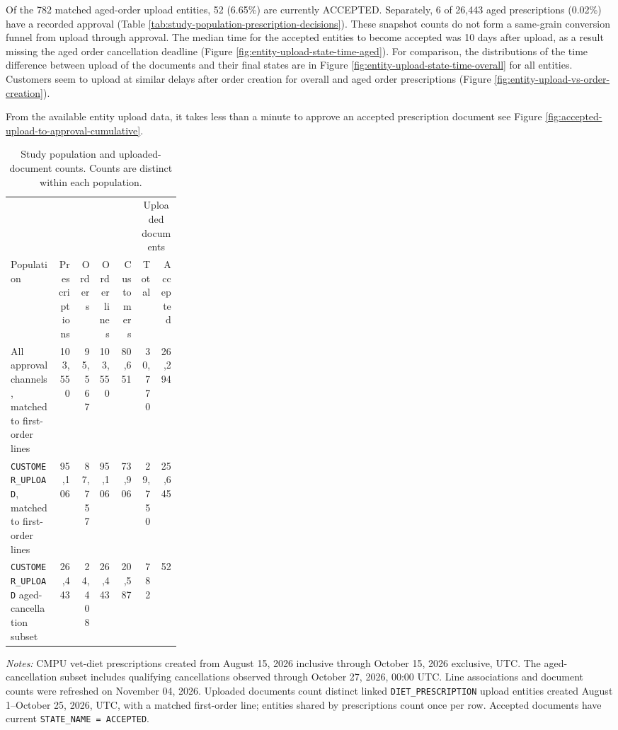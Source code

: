 Of the 782 matched aged-order upload entities, 52 (6.65\%) are currently
ACCEPTED. Separately, 6 of 26,443 aged prescriptions (0.02\%) have a
recorded approval (Table \ref{tab:study-population-prescription-decisions}).
These snapshot counts do not form a same-grain conversion funnel from
upload through approval. The median time for the accepted entities
to become accepted was 10 days after upload, as a result
missing the aged order cancellation deadline (Figure
\ref{fig:entity-upload-state-time-aged}).  For comparison, the
distributions of the time difference between upload of the documents
and their final states are in Figure
\ref{fig:entity-upload-state-time-overall} for all entities.
Customers seem to upload at similar delays after order creation for
overall and aged order prescriptions (Figure
\ref{fig:entity-upload-vs-order-creation}).

From the available entity upload data, it takes less than a minute to
approve an accepted prescription document see Figure
\ref{fig:accepted-upload-to-approval-cumulative}.

\begin{table}[htbp]
\centering
\caption{Study population and uploaded-document counts. Counts are distinct within each population.}
\label{tab:study-population-counts}
\small
\begin{tabular}{@{}>{\raggedright\arraybackslash}p{0.28\linewidth}rrrrrr@{}}
\toprule
& & & & & \multicolumn{2}{c}{Uploaded documents} \\
\cmidrule(lr){6-7}
Population & Prescriptions & Orders & \shortstack[r]{Order\\lines} & Customers & Total & Accepted \\
\midrule
All approval channels, matched to first-order lines & 103,550 & 95,567 & 103,550 & 80,651 & 30,770 & 26,294 \\
\texttt{CUSTOMER\_UPLOAD}, matched to first-order lines & 95,106 & 87,757 & 95,106 & 73,906 & 29,750 & 25,645 \\
\texttt{CUSTOMER\_UPLOAD} aged-cancellation subset & 26,443 & 24,408 & 26,443 & 20,587 & 782 & 52 \\
\bottomrule
\end{tabular}

\begin{minipage}{\linewidth}
\footnotesize
\textit{Notes:} CMPU vet-diet prescriptions created from August 15, 2026 inclusive
through October 15, 2026 exclusive, UTC. The aged-cancellation subset includes
qualifying cancellations observed through October 27, 2026, 00:00 UTC.
Line associations and document counts were refreshed on November 04, 2026.
Uploaded documents count distinct linked \texttt{DIET\_PRESCRIPTION} upload entities
created August 1--October 25, 2026, UTC, with a matched first-order line; entities
shared by prescriptions count once per row. Accepted documents have current
\texttt{STATE\_NAME = ACCEPTED}.
\end{minipage}
\end{table}

